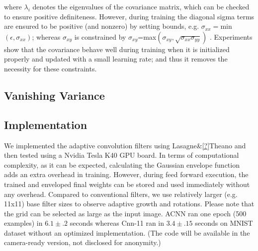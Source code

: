 \documentclass{bmvc2k}
\begin{document}
where $\lambda_i$ denotes the eigenvalues of the covariance matrix, which can be checked to ensure positive definiteness. However, during training the diagonal sigma terms are ensured to be positive (and nonzero) by setting bounds, e.g. $\sigma_{xx}=$min$\left(\epsilon,\sigma_{xx}\right)$; whereas $\sigma_{xy}$ is constrained by $\sigma_{xy}$=max$\left(\sigma_{xy},\sqrt{\sigma_{xx}\sigma_{yy}}\right)$ . Experiments show that the covariance behave well during training when it is initialized properly and updated with a small learning rate; and thus it removes the necessity for these constraints. 



\subsection{Vanishing Variance}
\subsection{Implementation}

We implemented the adaptive convolution filters using Lasagne\&\ref{?}Theano \cite{theano} and then tested using a Nvidia Tesla K40 GPU board. In terms of computational complexity, as it can be expected, calculating the Gaussian envelope function adds an extra overhead in training. However, during feed forward execution, the trained and enveloped final weights can be stored and used immediately without any overhead. Compared to conventional filters, we use relatively larger (e.g. 11x11) base filter sizes to observe adaptive growth and rotations. Please note that the grid can be selected as large as the input image. ACNN ran one epoch (500 examples) in $6.1 \pm .2$ seconds whereas Cnn-11 ran in $3.4 \pm .15$ seconds on MNIST dataset without an optimized implementation. (The code will be available in the camera-ready version, not disclosed for anonymity.)
\end{document}
